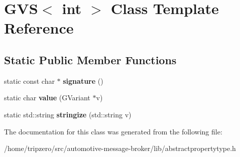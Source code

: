 \hypertarget{classGVS_3_01int_01_4}{\section{G\-V\-S$<$ int $>$ Class Template Reference}
\label{classGVS_3_01int_01_4}
}
\subsection*{Static Public Member Functions}
\begin{DoxyCompactItemize}
\item 
\hypertarget{classGVS_3_01int_01_4_aac00b94bc9b614c9adafdecc671b895e}{static const char $\ast$ {\bfseries signature} ()}\label{classGVS_3_01int_01_4_aac00b94bc9b614c9adafdecc671b895e}

\item 
\hypertarget{classGVS_3_01int_01_4_aa052b202a11ef95ac3a89e06acfa3e95}{static char {\bfseries value} (G\-Variant $\ast$v)}\label{classGVS_3_01int_01_4_aa052b202a11ef95ac3a89e06acfa3e95}

\item 
\hypertarget{classGVS_3_01int_01_4_ac284bb5efd7dc2bb3f641c94317a3385}{static std\-::string {\bfseries stringize} (std\-::string v)}\label{classGVS_3_01int_01_4_ac284bb5efd7dc2bb3f641c94317a3385}

\end{DoxyCompactItemize}


The documentation for this class was generated from the following file\-:\begin{DoxyCompactItemize}
\item 
/home/tripzero/src/automotive-\/message-\/broker/lib/abstractpropertytype.\-h\end{DoxyCompactItemize}
